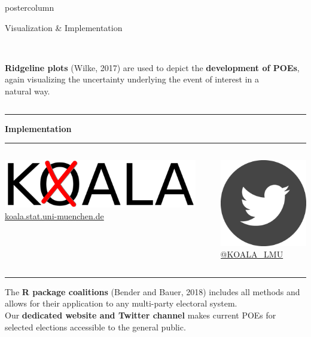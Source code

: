 \documentclass[final,hyperref={pdfpagelabels=false}]{beamer}
\newcommand{\bfBlue}[1]{\textcolor{koaladarkestblue}{\textbf{#1}}}
\newcommand{\blue}[1]{\textcolor{koaladarkestblue}{#1}}
\newcommand{\darkgray}[1]{\textcolor{koaladarkgray}{#1}}
\begin{document}
\begin{frame}
\begin{columns}
\begin{column}{1\textwidth}
\begin{columns}[T]
\begin{column}{.484\textwidth}
\begin{beamercolorbox}[center,wd=\textwidth]{postercolumn}
\begin{minipage}[T]{.95\textwidth}
\begin{block}{\footnotesize Visualization \& Implementation}
\begin{columns}[t]
  \begin{column}{.6\textwidth}
  \ \\
  \darkgray{\textbf{Ridgeline plots}} {\footnotesize (Wilke, 2017)} are used to depict the
  \darkgray{\textbf{development of POEs}}, again visualizing the uncertainty 
  underlying the event of interest in a \\ natural way.
  \end{column}
\end{columns}
\vspace{1ex}
\textcolor{LMUlightgray}{\hrule{}}
\vspace{6ex}
\bfBlue{Implementation}
\\[0.05cm]
\textcolor{LMUlightgray}{\hrule{}}
\vspace{1ex}
\begin{columns}[t]
  \begin{column}{.45\textwidth}
  \begin{center}\centering
  \includegraphics[height=3.5ex]{figures/Koala_Logo_ohneSchrift} \\
  \blue{\footnotesize \href{http://koala.stat.uni-muenchen.de}{koala.stat.uni-muenchen.de}}
  \end{center}
  \end{column}

  \hspace{-1.5ex}
  \textcolor{LMUlightgray}{\vrule{}}
  \hspace{1.5ex}

  \begin{column}{.45\textwidth}
  \begin{center}\centering
  \includegraphics[height=3.5ex]{figures/implementation_twitter} \\
  \blue{\footnotesize \href{https://twitter.com/KOALA_LMU}{@KOALA\_LMU}}
  \end{center}
  \end{column}
\end{columns}
\vspace{1ex}
\textcolor{LMUlightgray}{\hrule{}}
\vspace{3ex}

The \darkgray{\textbf{R package coalitions}} {\footnotesize (Bender and Bauer, 2018)}
includes all methods and allows for their application to any multi-party electoral system.
\\[1cm]
Our \darkgray{\textbf{dedicated website and Twitter channel}} makes current POEs
for selected elections accessible to the general public.


\end{block}
\end{minipage}
\end{beamercolorbox}
\end{column}
\end{columns}
\end{column}
\end{columns}
\end{frame}
\end{document}

